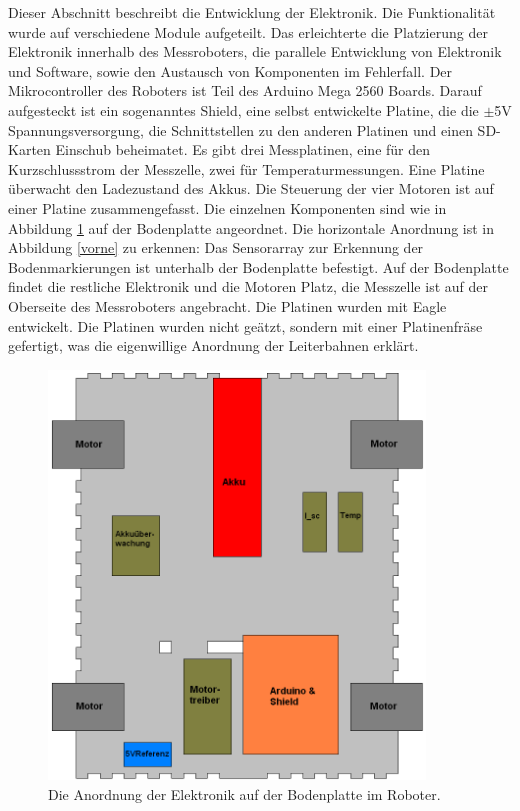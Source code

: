 \documentclass[a4paper,bibtotoc,oneside]{scrbook}
\begin{document}
Dieser Abschnitt beschreibt die Entwicklung der Elektronik. Die Funktionalität wurde auf verschiedene Module aufgeteilt. Das erleichterte die Platzierung der Elektronik innerhalb des Messroboters, die parallele Entwicklung von Elektronik und Software, sowie den Austausch von Komponenten im Fehlerfall. 
Der Mikrocontroller des Roboters ist Teil des Arduino Mega 2560 Boards. Darauf aufgesteckt ist ein sogenanntes Shield, eine selbst entwickelte Platine, die die $\pm$5V Spannungsversorgung, die Schnittstellen zu den anderen Platinen und einen SD-Karten Einschub beheimatet.
Es gibt drei Messplatinen, eine für den Kurzschlussstrom der Messzelle, zwei für Temperaturmessungen. Eine Platine überwacht den Ladezustand des Akkus. Die Steuerung der vier Motoren ist auf einer Platine zusammengefasst.
Die einzelnen Komponenten sind wie in Abbildung \ref{elek} auf der Bodenplatte angeordnet.
Die horizontale Anordnung ist in Abbildung \ref{vorne} zu erkennen: Das Sensorarray zur Erkennung der Bodenmarkierungen ist unterhalb der Bodenplatte befestigt. Auf der Bodenplatte findet die restliche Elektronik und die Motoren Platz, die Messzelle ist auf der Oberseite des Messroboters angebracht.
Die Platinen wurden mit Eagle entwickelt. Die Platinen wurden nicht geätzt, sondern mit einer Platinenfräse gefertigt, was die eigenwillige Anordnung der Leiterbahnen erklärt. 
\begin{figure}[htbp]
\centering
\includegraphics[width=100mm]{img/bodenplatte.png}
\caption{Die Anordnung der Elektronik auf der Bodenplatte im Roboter.}\label{elek}
\end{figure}
 
\end{document}

